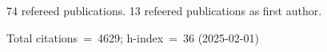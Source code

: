 74 refereed publications. 13 refeered publications as first author.

Total citations~=~4629; h-index~=~36 (2025-02-01)